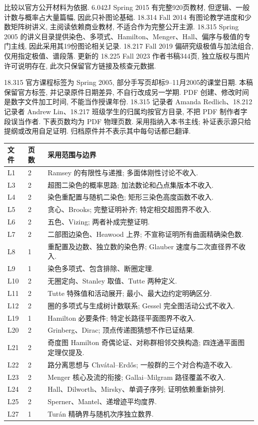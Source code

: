 \label{ch:sources}
比较以官方公开材料为依据. 6.042J Spring 2015 有完整920页教材, 但逻辑、一般计数与概率占大量篇幅, 因此只补图论基础. 18.314 Fall 2014 有图论教学进度和少数矩阵树讲义, 主阅读依赖商业教材, 不适合作为完整公开主源. 18.315 Spring 2005 的讲义目录提供染色、多项式、Hamilton、Menger、Hall、偏序与极值的专门主线, 因此采用其19份图论相关记录. 18.217 Fall 2019 偏研究级极值与加法组合, 仅用指定极值、谱段落. 更新的 18.225 Fall 2023 作者书稿344页, 独立版权与图片许可说明存在, 此次只保留官方链接及核查元数据.

18.315 官方课程标签为 Spring 2005, 部分手写页却标9--11月2005的课堂日期. 本稿保留官方标签, 并记录原件日期差异, 不自行改成另一学期. PDF 创建、修改时间是数字文件加工时间, 不能当作授课年份. 18.315 记录者 Amanda Redlich、18.212 记录者 Andrew Lin、18.217 班级学生的归属均按官方目录, 不把 PDF 制作者字段误当作者.
下表页数均为 PDF 物理页数. 采用指纳入本书主线; 补证表示源只给提纲或改用自足证明. 归档原件并不表示其中每句话都已翻译.
\begin{longtable}{p{13mm}p{12mm}p{130mm}}
\toprule
文件 & 页数 & 采用范围与边界\\\midrule\endhead
L1 & 2 & Ramsey 的有限性与递推; 多面体刚性讨论不收入.\\
L3 & 2 & 超图二染色的概率思路; 加法数论和凸点集版本不收入.\\
L4 & 2 & 染色重配置与随机二染色; 矩形三染色高度函数不收入.\\
L5 & 2 & 贪心、Brooks; 完整证明补齐; 特定相交超图界不收入.\\
L6 & 2 & 五色、Vizing; 两者补成完整证明.\\
L7 & 2 & 二部图边染色、Heawood 上界; 不宣称证明所有曲面精确染色数.\\
L8 & 1 & 重配置及边数、独立数的染色界; Glauber 速度与二次直径界不收入.\\
L9 & 1 & 染色多项式、包含排除、断圈定理.\\
L10 & 2 & 无圈定向、Stanley 取值、Tutte 两种定义.\\
L11 & 2 & Tutte 特殊值和活动展开; 最小、最大边约定明确区分.\\
L12 & 2 & 圈的多项式与生成树计数联系; Gessel 完全图活动公式不收入.\\
L19 & 1 & Hamilton 必要条件; 特定长路径平面图界不收入.\\
L20 & 2 & Grinberg、Dirac; 顶点传递图猜想不作已证结果.\\
L21 & 2 & 奇度图 Hamilton 奇偶论证、对称群相邻交换构造; 四连通平面图定理仅提及.\\
L22 & 2 & 路分离思想与 Chvátal--Erdős; 一般群的三个对合构造不收入.\\
L23 & 2 & Menger 核心及流的衔接; Gallai--Milgram 路径覆盖不收入.\\
L24 & 2 & Hall、Dilworth、Mirsky、单调子序列; 证明依赖重新排列.\\
L25 & 2 & Sperner、Mantel、递增迹平均度界.\\
L27 & 1 & Turán 精确界与随机次序独立数界.\\\bottomrule
\end{longtable}
